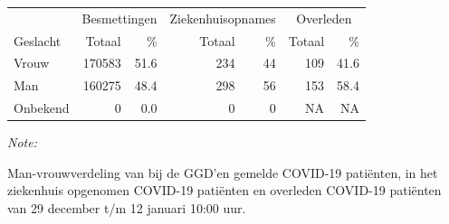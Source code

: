 \documentclass[
  english,
  man,floatsintext]{apa6}
\begin{document}
\begin{table}
\centering\begingroup\fontsize{11}{13}\selectfont

\begin{threeparttable}
\begin{tabular}{lrrrrrr}
\toprule
\multicolumn{1}{c}{ } & \multicolumn{2}{c}{Besmettingen} & \multicolumn{2}{c}{Ziekenhuisopnames} & \multicolumn{2}{c}{Overleden} \\
\cmidrule(l{3pt}r{3pt}){2-3} \cmidrule(l{3pt}r{3pt}){4-5} \cmidrule(l{3pt}r{3pt}){6-7}
Geslacht & Totaal & \% & Totaal & \% & Totaal & \%\\
\midrule
Vrouw & 170583 & 51.6 & 234 & 44 & 109 & 41.6\\
Man & 160275 & 48.4 & 298 & 56 & 153 & 58.4\\
Onbekend & 0 & 0.0 & 0 & 0 & NA & NA\\
\bottomrule
\end{tabular}
\begin{tablenotes}
\item \textit{Note: } 
\item Man-vrouwverdeling van bij de GGD’en gemelde COVID-19 patiënten, in het ziekenhuis opgenomen COVID-19 patiënten en overleden COVID-19 patiënten van 29 december t/m 12 januari 10:00 uur.
\end{tablenotes}
\end{threeparttable}
\endgroup{}
\end{table}
\newpage
\end{document}
